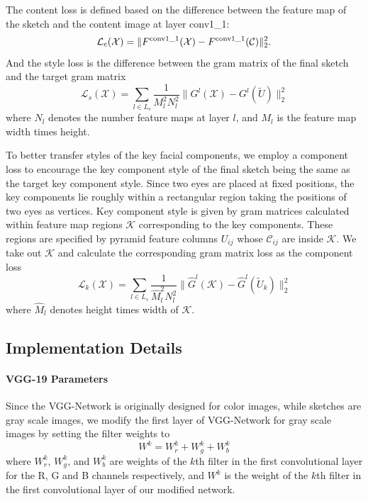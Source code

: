 \documentclass[10pt,twocolumn,letterpaper]{article}
\begin{document}
The content loss is defined based on the difference between the feature map of the sketch and the content image at layer conv1\_1:
\begin{equation}
\mathcal{L}_{c}( \mathcal{X} ) = \| {{F^{\rm{conv1\_1}}}( \mathcal{X} ) - {F^{\rm{conv1\_1}}}( \mathcal{C} )} \|_2^2.
\label{eq:content_loss}
\end{equation}
And the style loss is the difference between the gram matrix of the final sketch and the target gram matrix 
\begin{equation}
\mathcal{L}_{s} ( \mathcal{X} ) = \sum\limits_{l \in {L_s}} {\frac{1}{{M_l^2N_l^2}}\| {{G^l}( \mathcal{X} ) - G^l(\tilde{U})} \|_2^2} 
\label{eq:Gram_loss}
\end{equation}
where $N_l$ denotes the number feature maps at layer $l$, and $M_l$ is the feature map width times height.  

To better transfer styles of the key facial components, we employ a component loss to encourage the key component style of the final sketch being the same as the target key component style. Since two eyes are placed at fixed positions, the key components lie roughly within a rectangular region taking the positions of two eyes as vertices. Key component style is given by gram matrices calculated within feature map regions $\mathcal K$ corresponding to the key components. These regions are specified by pyramid feature columns $U_{ij}$ whose $\mathcal{C}_{ij}$ are inside $\mathcal K$. We take out $\mathcal K$ and calculate the corresponding gram matrix loss as the component loss
\begin{equation}
\mathcal{L}_{k} ( \mathcal{X} ) = \sum\limits_{l \in {L_s}} {\frac{1}{{\hat{M}_l^2{N}_l^2}}\| {{{\hat G}^l}( \mathcal{K} ) - {\hat G}^l(\tilde{U}_k)} \|_2^2} 
\label{eq:component_loss}
\end{equation}
where $\hat{M}_l$ denotes height times width of $\mathcal K$. 

\subsection{Implementation Details}

\paragraph*{VGG-19 Parameters} Since the VGG-Network is originally designed for color images, while sketches are gray scale images, we modify the first layer of VGG-Network for gray scale images by setting the filter weights to
\begin{equation}
W^{k} = W^{k}_r+W^{k}_g+W^{k}_b
\label{eq:VGG_weights}
\end{equation}
where $W^{k}_r$, $W^{k}_g$, and $W^{k}_b$ are weights of the $k$th filter in the first convolutional layer for the R, G and B channels respectively, and $W^{k}$ is the weight of the $k$th filter in the first convolutional layer of our modified network.
\end{document}
